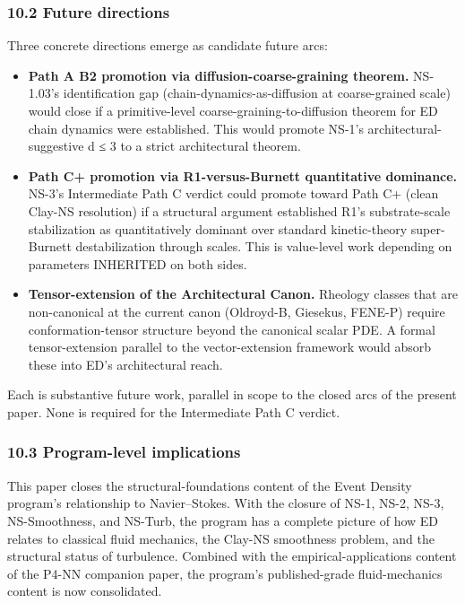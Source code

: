 \documentclass[
]{article}
\providecommand{\tightlist}{%
  \setlength{\itemsep}{0pt}\setlength{\parskip}{0pt}}
\begin{document}
\subsubsection{10.2 Future directions}\label{future-directions}

Three concrete directions emerge as candidate future arcs:

\begin{itemize}
\tightlist
\item
  \textbf{Path A B2 promotion via diffusion-coarse-graining theorem.}
  NS-1.03's identification gap (chain-dynamics-as-diffusion at
  coarse-grained scale) would close if a primitive-level
  coarse-graining-to-diffusion theorem for ED chain dynamics were
  established. This would promote NS-1's architectural-suggestive d ≤ 3
  to a strict architectural theorem.
\item
  \textbf{Path C+ promotion via R1-versus-Burnett quantitative
  dominance.} NS-3's Intermediate Path C verdict could promote toward
  Path C+ (clean Clay-NS resolution) if a structural argument
  established R1's substrate-scale stabilization as quantitatively
  dominant over standard kinetic-theory super-Burnett destabilization
  through scales. This is value-level work depending on parameters
  INHERITED on both sides.
\item
  \textbf{Tensor-extension of the Architectural Canon.} Rheology classes
  that are non-canonical at the current canon (Oldroyd-B, Giesekus,
  FENE-P) require conformation-tensor structure beyond the canonical
  scalar PDE. A formal tensor-extension parallel to the vector-extension
  framework would absorb these into ED's architectural reach.
\end{itemize}

Each is substantive future work, parallel in scope to the closed arcs of
the present paper. None is required for the Intermediate Path C verdict.

\subsubsection{10.3 Program-level
implications}\label{program-level-implications}

This paper closes the structural-foundations content of the Event
Density program's relationship to Navier--Stokes. With the closure of
NS-1, NS-2, NS-3, NS-Smoothness, and NS-Turb, the program has a complete
picture of how ED relates to classical fluid mechanics, the Clay-NS
smoothness problem, and the structural status of turbulence. Combined
with the empirical-applications content of the P4-NN companion paper,
the program's published-grade fluid-mechanics content is now
consolidated.
\end{document}
